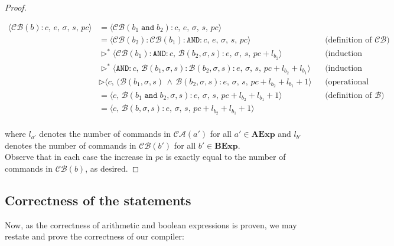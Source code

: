 \documentclass{article}
\begin{document}
\begin{proof}
\begin{itemize}
    \[
      \begin{aligned}
        \langle  \mathcal{CB}(b) : c,\, e,\, \sigma,\, s,\, pc \rangle 
        &= \langle \mathcal{CB}(b_1 \;\texttt{and}\; b_2) : c,\, e,\, \sigma,\, s,\, pc \rangle \\
        &= \langle \mathcal{CB}(b_2) : \mathcal{CB}(b_1) : \texttt{AND} : c,\, e,\, \sigma,\, s,\, pc \rangle 
        && \text{(definition of $\mathcal{CB}$)} \\
        &\triangleright^\ast \langle \mathcal{CB}(b_1) : \texttt{AND} : c,\, \mathcal{B}(b_2, \sigma, s) : e,\, \sigma,\, s,\, pc + l_{b_2} \rangle 
        && \text{(induction hypothesis 2)} \\
        &\triangleright^\ast \langle \texttt{AND} : c,\, \mathcal{B}(b_1, \sigma, s) : \mathcal{B}(b_2, \sigma, s) : e,\, \sigma,\, s,\, pc + l_{b_2} + l_{b_1} \rangle 
        && \text{(induction hypothesis 2)} \\
        &\triangleright \langle c,\, (\mathcal{B}(b_1, \sigma, s) \,\land\, \mathcal{B}(b_2, \sigma, s) : e,\, \sigma,\, s,\, pc + l_{b_2} + l_{b_1} + 1 \rangle
        && \text{(operational semantics)} \\
        &= \langle c,\, \mathcal{B}(b_1 \;\texttt{and}\; b_2, \sigma, s) : e,\, \sigma,\, s,\, pc + l_{b_2} + l_{b_1} + 1 \rangle 
        && \text{(definition of $\mathcal{B}$)} \\
        &= \langle c,\, \mathcal{B}(b, \sigma, s) : e,\, \sigma,\, s,\, pc + l_{b_2} + l_{b_1} + 1 \rangle \\
      \end{aligned}
  \]
\end{itemize}

where $l_{a'}$ denotes the number of commands in $\mathcal{CA}(a')$ for all $a' \in \textbf{AExp}$ and $l_{b'}$ denotes the number of commands in $\mathcal{CB}(b')$ for all $b' \in \textbf{BExp}$.\\
Observe that in each case the increase in $pc$ is exactly equal to the number of commands in $\mathcal{CB}(b)$, as desired.

\end{proof}

\subsection{Correctness of the statements}

Now, as the correctness of arithmetic and boolean expressions is proven, we may restate and prove the correctness of our compiler:
\end{document}
